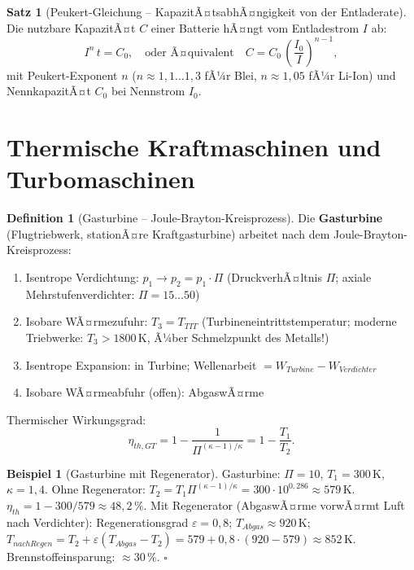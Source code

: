﻿\documentclass[a4paper,12pt]{report}
\theoremstyle{definition}
\newtheorem{definition}{Definition}
\newtheorem{beispiel}{Beispiel}
\newtheorem{satz}{Satz}
\begin{document}
\begin{satz}[Peukert-Gleichung -- KapazitÃ¤tsabhÃ¤ngigkeit von der Entladerate]
Die nutzbare KapazitÃ¤t $C$ einer Batterie hÃ¤ngt vom Entladestrom $I$ ab:
\[
  I^n\,t = C_0, \quad \text{oder Ã¤quivalent}\quad C = C_0\,\left(\frac{I_0}{I}\right)^{n-1},
\]
mit Peukert-Exponent $n$ ($n \approx 1{,}1\ldots1{,}3$ fÃ¼r Blei, $n \approx 1{,}05$ fÃ¼r Li-Ion)
und NennkapazitÃ¤t $C_0$ bei Nennstrom $I_0$.
\end{satz}



\section{Thermische Kraftmaschinen und Turbomaschinen}

\begin{definition}[Gasturbine -- Joule-Brayton-Kreisprozess]
Die \textbf{Gasturbine} (Flugtriebwerk, stationÃ¤re Kraftgasturbine) arbeitet
nach dem Joule-Brayton-Kreisprozess:
\begin{enumerate}
    \item Isentrope Verdichtung: $p_1 \to p_2 = p_1\cdot\Pi$
          (DruckverhÃ¤ltnis $\Pi$; axiale Mehrstufenverdichter: $\Pi = 15\ldots50$)
    \item Isobare WÃ¤rmezufuhr: $T_3 = T_{TIT}$ (Turbineneintrittstemperatur;
          moderne Triebwerke: $T_3 > 1800\,\mathrm{K}$, Ã¼ber Schmelzpunkt des Metalls!)
    \item Isentrope Expansion: in Turbine; Wellenarbeit $= W_{Turbine} - W_{Verdichter}$
    \item Isobare WÃ¤rmeabfuhr (offen): AbgaswÃ¤rme
\end{enumerate}
Thermischer Wirkungsgrad:
\[
  \eta_{th,GT} = 1 - \frac{1}{\Pi^{(\kappa-1)/\kappa}} = 1 - \frac{T_1}{T_2}.
\]
\end{definition}

\begin{beispiel}[Gasturbine mit Regenerator]
Gasturbine: $\Pi = 10$, $T_1 = 300\,\mathrm{K}$, $\kappa = 1{,}4$.
Ohne Regenerator: $T_2 = T_1\Pi^{(\kappa-1)/\kappa} = 300\cdot10^{0{,}286} \approx 579\,\mathrm{K}$.
$\eta_{th} = 1 - 300/579 \approx 48{,}2\,\%$.
Mit Regenerator (AbgaswÃ¤rme vorwÃ¤rmt Luft nach Verdichter):
Regenerationsgrad $\varepsilon = 0{,}8$; $T_{Abgas} \approx 920\,\mathrm{K}$;
$T_{nach Regen} = T_2 + \varepsilon(T_{Abgas} - T_2) = 579 + 0{,}8\cdot(920-579) \approx 852\,\mathrm{K}$.
Brennstoffeinsparung: $\approx 30\,\%$. $\square$
\end{beispiel}
\end{document}
